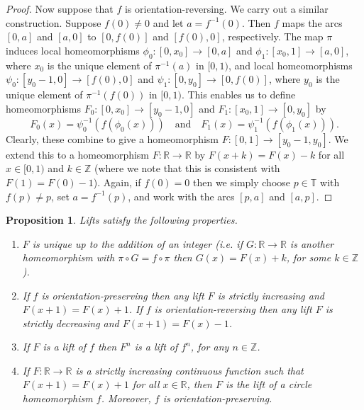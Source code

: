 \documentclass[12pt]{article}
\newtheorem{proposition}[theorem]{Proposition}
\theoremstyle{definition}
\theoremstyle{remark}
\begin{document}
\begin{proof}
Now suppose that $f$ is orientation-reversing. We carry out a similar construction.
Suppose $f(0) \ne 0$ and let $a = f^{-1}(0)$. Then
$f$ maps the arcs $[0,a]$ and $[a,0]$ to $[0,f(0)]$ and $[f(0),0]$, respectively.
The map $\pi$ induces 
local homeomorphisms
$\phi_0 : [0,x_0] \to [0,a]$
and
$\phi_1 : [x_0,1] \to [a,0]$,
where $x_0$ is the unique element of $\pi^{-1}(a)$ in $[0,1)$,
and 
local homeomorphisms
$\psi_0: [y_0-1,0] \to [f(0),0]$
and 
$\psi_1 : [0,y_0] \to [0,f(0)]$,
where $y_0$ is the unique element of $\pi^{-1}(f(0))$ in $[0,1)$.
This enables us to define homeomorphisms $F_0 : [0,x_0]  \to [y_0-1,0]$
and $F_1 : [x_0,1] \to [0,y_0]$
by 
\[
F_0(x) =  \psi_0^{-1}(f(\phi_0(x))) \quad \text{and} \quad
F_1(x) =  \psi_1^{-1}(f(\phi_1(x))).
\]
Clearly, these combine to give a homeomorphism $F : [0,1] \to [y_0-1,y_0]$.
We extend this to a homeomorphism $F : \mathbb R \to \mathbb R$
by $F(x+k) = F(x) -k$ for all $x \in [0,1)$ and $k \in \mathbb Z$
(where we note that this is consistent with $F(1)=F(0)-1$).
Again, if $f(0)=0$ then we simply choose $p \in \mathbb T$ with $f(p) \ne p$, set $a = f^{-1}(p)$,
and work with the arcs $[p,a]$ and $[a,p]$.
\end{proof}

\begin{proposition} \label{properties_of_lifts}
Lifts satisfy the following properties.
\begin{enumerate}
\item[(1)]
$F$ is unique up to the addition of an integer (i.e. if $G : \mathbb R \to \mathbb R$ is another
homeomorphism with $\pi \circ G = f \circ \pi$ then $G(x) = F(x) + k$, for some $k \in \mathbb Z$).
\item[(2)]
If $f$ is orientation-preserving then any lift $F$ is strictly increasing 
and
$
F(x+1) = F(x)+1$.
If $f$ is orientation-reversing then any lift $F$ is strictly decreasing and $F(x+1)=F(x)-1$.
\item[(3)]
If $F$ is a lift of $f$ then $F^n$ is a lift of $f^n$, for any $n \in \mathbb Z$.
\item[(4)]
If $F: \mathbb R \to \mathbb R$ is a strictly increasing continuous function such that
$F(x+1)=F(x)+1$ for all $x \in \mathbb R$, then $F$ is the lift of a circle homeomorphism $f$. Moreover, $f$ is
orientation-preserving.
\end{enumerate}
\end{proposition}
\end{document}
